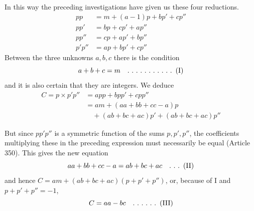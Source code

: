 In this way the preceding investigations have given us these four reductions.
\[\begin{aligned}pp&=m+(a-1)p+bp'+cp''\\pp'&=bp+cp'+ap''\\pp''&=cp+ap'+bp''\\p'p''&=ap+bp'+cp''\end{aligned}\] Between the three unknowns \(a,\allowbreak b,\allowbreak c\) there is the condition \[a+b+c=m\quad \ldotp\,\ldotp\,\ldotp\,\ldotp\,\ldotp\,\ldotp\,\ldotp\,\ldotp\,\ldotp\,\ldotp\,\ldotp\ (\mathrm{I})\] and it is also certain that they are integers. We deduce \[\begin{aligned}C=p\times p'p''&=app+bpp'+cpp''\\&=am+(aa+bb+cc-a)p\\&\quad+(ab+bc+ac)p'+(ab+bc+ac)p''\end{aligned}\]

But since \(pp'p''\) is a symmetric function of the sums \(p,\allowbreak p',\allowbreak p''\), the coefficients multiplying these in the preceding expression must necessarily be equal (Article 350). This gives the new equation \[aa+bb+cc-a=ab+bc+ac\quad \ldotp\,\ldotp\,\ldotp\ (\mathrm{II})\] and hence \(C=am+(ab+bc+ac)(p+p'+p'')\), or, because of I and \(p+p'+p''=-1\), \[C=aa-bc\quad \ldotp\,\ldotp\,\ldotp\,\ldotp\,\ldotp\,\ldotp\ (\mathrm{III})\]

